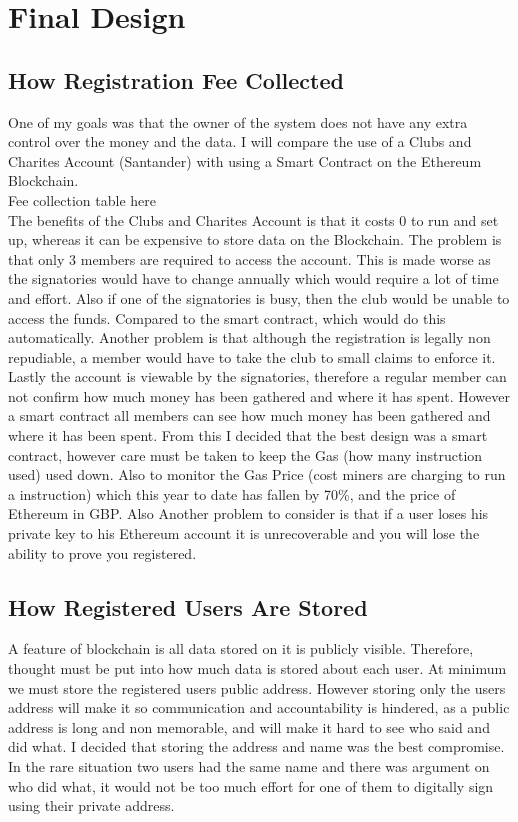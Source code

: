 \chapter{Final Design} \label{Chapter: Final Design}
\section{How Registration Fee Collected}
One of my goals was that the owner of the system does not have any extra control over the money and the data. I will compare the use of a Clubs and Charites Account (Santander) with using a Smart Contract on the Ethereum Blockchain. 
\\
Fee collection table here
\\
The benefits of the Clubs and Charites Account is that it costs 0 to run and set up, whereas it can be expensive to store data on the Blockchain. The problem is that only 3 members are required to access the account. This is made worse as the signatories would have to change annually which would require a lot of time and effort. Also if one of the signatories is busy, then the club would be unable to access the funds. Compared to the smart contract, which would do this automatically.  Another problem is that although the registration is legally non repudiable, a member would have to take the club to small claims to enforce it. Lastly the account is viewable by the signatories, therefore a regular member can not confirm how much money has been gathered and where it has spent. However a smart contract all members can see how much money has been gathered and where it has been spent.
From this I decided that the best design was a smart contract, however care must be taken to keep the Gas (how many instruction used) used down. Also to monitor the Gas Price (cost miners are charging to run a instruction) which this year to date has fallen by 70\%, and the price of Ethereum in GBP. Also Another problem to consider is that if a user loses his private key to his Ethereum account it is unrecoverable and you will lose the ability to prove you registered.
\section{How Registered Users Are Stored}
A feature of blockchain is all data stored on it is publicly visible. Therefore, thought must be put into how much data is stored about each user. At minimum we must store the registered users public address. However storing only the users address will make it so communication and accountability is hindered, as a public address is long and non memorable, and will make it hard to see who said and did what. I decided that storing the address and name was the best compromise. In the rare situation two users had the same name and there was argument on who did what, it would not be too much effort for one of them to digitally sign using their private address.
